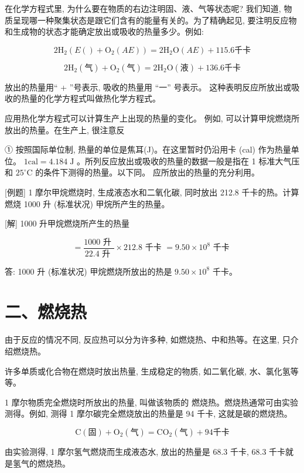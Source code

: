 \documentclass[10pt]{article}
\begin{document}
在化学方程式里, 为什么要在物质的右边注明固、液、气等状态呢? 我们知道, 物质呈现哪一种聚集状态是跟它们含有的能量有关的。为了精确起见, 要注明反应物和生成物的状态才能确定放出或吸收的热量多少。例如:

\[
2{\mathrm{H}}_{2}\left( {E\left( \right) + {\mathrm{O}}_{2}\left( {AE}\right) }\right) = 2{\mathrm{H}}_{2}\mathrm{O}\left( {AE}\right) + {115.6}\text{千卡}
\]

\[
2{\mathrm{H}}_{2}\left( 气\right) + {\mathrm{O}}_{2}\left( 气\right) = 2{\mathrm{H}}_{2}\mathrm{O}\left( 液\right) + {136.6}\text{千卡}
\]

放出的热量用“ + ”号表示, 吸收的热量用 “一” 号表示。 这种表明反应所放出或吸收的热量的化学方程式叫做热化学方程式。

应用热化学方程式可以计算生产上出现的热量的变化。 例如, 可以计算甲烷燃烧所放出的热量。在生产上, 很注意反

① 按照国际单位制, 热量的单位是焦耳(J)。在这里暂时仍沿用卡 (cal) 作为热量单位。 \(1\mathrm{{cal}} = {4.184}\mathrm{\;J}\) 。所列反应放出或吸收的热量的数据一般是指在 1 标准大气压和 \({25}^{ \circ }\mathrm{C}\) 的条件下测得的热量。以下同。 应所放出的热量的充分利用。

[例题] 1 摩尔甲烷燃烧时, 生成液态水和二氧化碳, 同时放出 212.8 千卡的热。计算燃烧 1000 升 (标准状况) 甲烷所产生的热量。

[解] 1000 升甲烷燃烧所产生的热量

\[
= \frac{{1000}\text{ 升 }}{{22.4}\text{ 升 }} \times {212.8}\text{ 千卡 } = {9.50} \times {10}^{8}\text{ 千卡 }
\]

答: 1000 升 (标准状况) 甲烷燃烧所放出的热是 \({9.50} \times {10}^{8}\) 千卡。

\section*{二、燃烧热}

由于反应的情况不同, 反应热可以分为许多种, 如燃烧热、中和热等。在这里, 只介绍燃烧热。

许多单质或化合物在燃烧时放出热量, 生成稳定的物质, 如二氧化碳, 水、氯化氢等等。

1 摩尔物质完全燃烧时所放出的热量, 叫做该物质的 燃烧热。燃烧热通常可由实验测得。例如, 测得 1 摩尔碳完全燃烧放出的热量是 94 千卡, 这就是碳的燃烧热。

\[
\mathrm{C}\left( \text{固}\right) + {\mathrm{O}}_{2}\left( \text{气}\right) = {\mathrm{{CO}}}_{2}\left( \text{气}\right) + {94}\text{千卡}
\]

由实验测得, 1 摩尔氢气燃烧而生成液态水, 放出的热量是 68.3 千卡, 68.3 千卡就是氢气的燃烧热。
\end{document}
